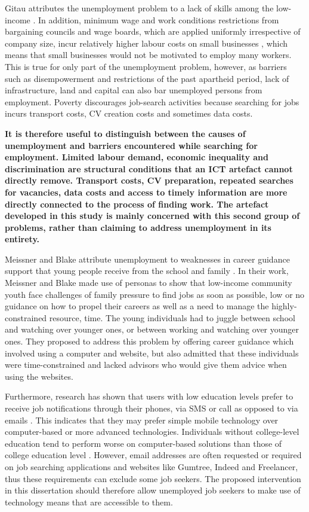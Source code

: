 Gitau attributes the unemployment problem to a lack of skills among the low-income \cite{gitau2012}. In addition, minimum wage and work conditions restrictions from bargaining councils and wage boards, which are applied uniformly irrespective of company size, incur relatively higher labour costs on small businesses \cite{kingdon2001}, which means that small businesses would not be motivated to employ many workers. This is true for only part of the unemployment problem, however, as barriers such as disempowerment and restrictions of the past apartheid period, lack of infrastructure, land and capital can also bar unemployed persons from employment. Poverty discourages job-search activities \cite{orkin1998} because searching for jobs incurs transport costs, CV creation costs and sometimes data costs.

\textbf{It is therefore useful to distinguish between the causes of unemployment and barriers encountered while searching for employment. Limited labour demand, economic inequality and discrimination are structural conditions that an ICT artefact cannot directly remove. Transport costs, CV preparation, repeated searches for vacancies, data costs and access to timely information are more directly connected to the process of finding work. The artefact developed in this study is mainly concerned with this second group of problems, rather than claiming to address unemployment in its entirety.}

Meissner and Blake attribute unemployment to weaknesses in career guidance support that young people receive from the school and family \cite{meissner2011}. In their work, Meissner and Blake made use of personas to show that low-income community youth face challenges of family pressure to find jobs as soon as possible, low or no guidance on how to propel their careers as well as a need to manage the highly-constrained resource, time. The young individuals had to juggle between school and watching over younger ones, or between working and watching over younger ones. They proposed to address this problem by offering career guidance which involved using a computer and website, but also admitted that these individuals were time-constrained and lacked advisors who would give them advice when using the websites.

Furthermore, research has shown that users with low education levels prefer to receive job notifications through their phones, via SMS or call as opposed to via emails \cite{white2012}. This indicates that they may prefer simple mobile technology over computer-based or more advanced technologies. Individuals without college-level education tend to perform worse on computer-based solutions than those of college education level \cite{algarin2009}. However, email addresses are often requested or required on job searching applications and websites like Gumtree, Indeed and Freelancer, thus these requirements can exclude some job seekers. The proposed intervention in this dissertation should therefore allow unemployed job seekers to make use of technology means that are accessible to them.

